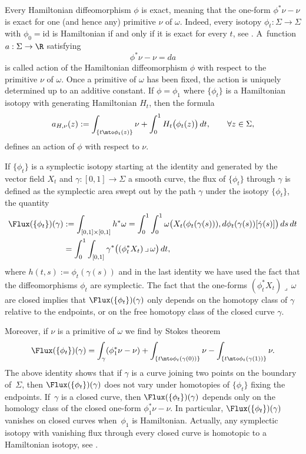 Every Hamiltonian diffeomorphism $\phi$ is exact, meaning that the one-form $\phi^* \nu - \nu$ is exact for one (and hence any) primitive $\nu$ of $\omega$. Indeed, every isotopy $\phi_t: \Sigma \to \Sigma$ with $\phi_0=\mathrm{id}$ is Hamiltonian if and only if it is exact for every $t$, see \cite[Prop.\,9.3.1]{McDuff:1998uu}. A~function $a: \Sigma \to \R$ satisfying
\[
\phi^* \nu - \nu = da
\]
is called action of the Hamiltonian diffeomorphism $\phi$ with respect to the primitive $\nu$ of $\omega$. Once a primitive of $\omega$ has been fixed, the action is uniquely determined up to an additive constant. If $\phi=\phi_1$ where $\{\phi_t\}$ is a Hamiltonian isotopy with generating Hamiltonian $H_t$, then the formula
\begin{equation}
\label{canaction}
a_{H,\nu}(z) := \int_{\{t\mto \phi_t(z)\}} \nu + \int_0^1 H_t \bigl(\phi_t(z)\bigr)\, dt, \qquad \forall z\in \Sigma,
\end{equation}
defines an action of $\phi$ with respect to $\nu$.

If $\{\phi_t\}$ is a symplectic isotopy starting at the identity and generated by the vector field $X_t$ and $\gamma: [0,1] \to \Sigma$ a smooth curve, the flux of $\{\phi_t\}$ through $\gamma$ is defined as the symplectic area swept out by the path $\gamma$ under the isotopy $\{\phi_t\}$, \ie the quantity
\[
\begin{split}
\Flux(\{\phi_t\})(\gamma) &:= \int_{[0,1]\times [0,1]} h^* \omega = \int_0^1 \int_0^1 \omega\bigl(X_t(\phi_t(\gamma(s))),d\phi_t(\gamma(s)) [ \dot{\gamma}(s) ] \bigr)\, ds \, dt \\ &= \int_0^1 \int_{[0,1]} \gamma^* \bigl( (\phi_t^* X_t) \,\lrcorner\, \omega \bigr)\, dt,
\end{split}
\]
where $h(t,s) := \phi_t(\gamma(s))$ and in the last identity we have used the fact that the diffeomorphisms $\phi_t$ are symplectic. The fact that the one-forms $(\phi_t^*X_t)\lrcorner\,\omega$ are closed implies that $\Flux(\{\phi_t\})(\gamma)$ only depends on the homotopy class of $\gamma$ relative to the endpoints, or on the free homotopy class of the closed curve $\gamma$.

Moreover, if $\nu$ is a primitive of $\omega$ we find by Stokes theorem
\[
\Flux(\{\phi_t\})(\gamma) = \int_{\gamma} (\phi_1^* \nu-\nu) + \int_{\{t \mto \phi_t(\gamma(0))\}} \nu - \int_{\{t \mto \phi_t(\gamma(1))\}} \nu.
\]
The above identity shows that if $\gamma$ is a curve joining two points on the boundary of~$\Sigma$, then $\Flux(\{\phi_t\})(\gamma)$ does not vary under homotopies of $\{\phi_t\}$ fixing the endpoints. If~$\gamma$ is a closed curve, then $\Flux(\{\phi_t\})(\gamma)$ depends only on the homology class of the closed one-form $\phi_1^* \nu - \nu$. In particular, $\Flux(\{\phi_t\})(\gamma)$ vanishes on closed curves when~$\phi_1$ is Hamiltonian. Actually, any symplectic isotopy with vanishing flux through every closed curve is homotopic to a Hamiltonian isotopy, see \cite[Th.\,10.2.5]{McDuff:1998uu}.

